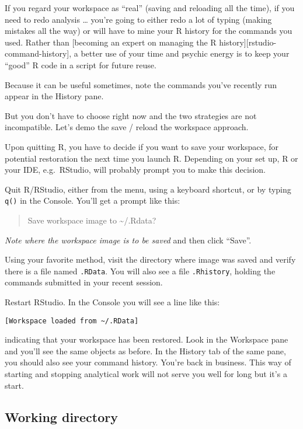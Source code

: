 \documentclass[
]{book}
\begin{document}
If you regard your workspace as ``real'' (saving and reloading all the time), if you need to redo analysis \ldots{} you're going to either redo a lot of typing (making mistakes all the way) or will have to mine your R history for the commands you used. Rather than {[}becoming an expert on managing the R history{]}{[}rstudio-command-history{]}, a better use of your time and psychic energy is to keep your ``good'' R code in a script for future reuse.

Because it can be useful sometimes, note the commands you've recently run appear in the History pane.

But you don't have to choose right now and the two strategies are not incompatible. Let's demo the save / reload the workspace approach.

Upon quitting R, you have to decide if you want to save your workspace, for potential restoration the next time you launch R. Depending on your set up, R or your IDE, e.g.~RStudio, will probably prompt you to make this decision.

Quit R/RStudio, either from the menu, using a keyboard shortcut, or by typing \texttt{q()} in the Console. You'll get a prompt like this:

\begin{quote}
Save workspace image to \textasciitilde/.Rdata?
\end{quote}

\emph{Note where the workspace image is to be saved} and then click ``Save''.

Using your favorite method, visit the directory where image was saved and verify there is a file named \texttt{.RData}. You will also see a file \texttt{.Rhistory}, holding the commands submitted in your recent session.

Restart RStudio. In the Console you will see a line like this:

\begin{verbatim}
[Workspace loaded from ~/.RData]
\end{verbatim}

indicating that your workspace has been restored. Look in the Workspace pane and you'll see the same objects as before. In the History tab of the same pane, you should also see your command history. You're back in business. This way of starting and stopping analytical work will not serve you well for long but it's a start.

\hypertarget{working-directory}{%
\subsection{Working directory}\label{working-directory}}
\end{document}
